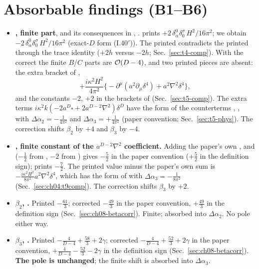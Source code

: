 \section{Absorbable findings (B1--B6)}
\label{sec:sum-abs}
\begin{itemize}[leftmargin=14pt,itemsep=2pt]
\item[\textbf{B1}] \textbf{, finite part}, and its consequences in , . \PI{} prints $+2\,\delta^0_\alpha\delta^\sigma_0\,H^2/16\pi^2$;
we obtain $-2\,\delta^0_\alpha\delta^\sigma_0\,H^2/16\pi^2$ (exact-$D$ form (I.40$'$)). The printed  contradicts the printed  through the
trace identity ($+2h$ versus $-2h$; Sec.~\ref{sec:t4-comp}). With the correct  the finite $B$/$C$ parts are $\mathcal{O}\!\left(D-4\right)$, and two printed pieces
are absent: the extra bracket of ,
\[
+\frac{i\kappa^2H^2}{4\pi^2}\big\{-\partial^\mu(a^2\partial_\mu\delta^4)+a^2\nabla^2\delta^4\big\},
\]
and the constants $-2$, $+2$ in the brackets of  (Sec.~\ref{sec:t5-comp}). The extra terms $i\kappa^2k(-2a^D\square+2a^{D-2}\nabla^2)\delta^D$ have the form
of the counterterms , , with $\Delta\alpha_2=-\tfrac1{4\pi^2}$ and $\Delta\alpha_3=+\tfrac1{4\pi^2}$ (paper convention;
Sec.~\ref{sec:t5-phys}). The correction shifts $\beta_2$ by $+4$ and $\beta_3$ by $-4$.
\item[\textbf{B2}] \textbf{, finite constant of the $a^{D-2}\nabla^2$ coefficient.} Adding the paper's own ,  and 
($-\tfrac12$ from , $-2$ from ) gives $-\tfrac52$ in the paper convention ($+\tfrac52$ in the definition sign); \PI{} prints $-\tfrac72$.
The printed value minus the paper's own sum is $-\tfrac{i\kappa^2H^2}{8\pi^2}a^2\nabla^2\delta^4$, which has the form of  with
$\Delta\alpha_3=-\tfrac1{8\pi^2}$ (Sec.~\ref{sec:ch04:t9comp}). The correction shifts $\beta_3$ by $+2$.
\item[\textbf{B3}] \textbf{$\beta_2$, .} Printed $-\tfrac{61}{3}$; corrected $-\tfrac{49}{3}$ in the paper convention, $+\tfrac{49}{3}$ in the definition
sign (Sec.~\ref{sec:ch08-betacorr}). Finite; absorbed into $\Delta\alpha_2$. No pole either way.
\item[\textbf{B4}] \textbf{$\beta_3$, .} Printed $-\tfrac{4}{D-4}+\tfrac{58}{3}+2\gamma$; corrected $-\tfrac{4}{D-4}+\tfrac{52}{3}+2\gamma$ in the paper
convention, $+\tfrac{4}{D-4}-\tfrac{52}{3}-2\gamma$ in the definition sign (Sec.~\ref{sec:ch08-betacorr}). \textbf{The pole is unchanged}; the finite shift is
absorbed into $\Delta\alpha_3$.

\end{itemize}
